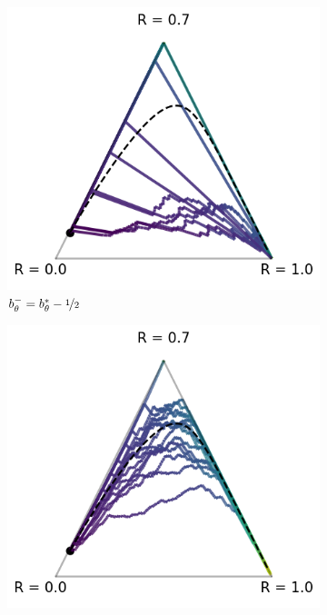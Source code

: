 \begin{figure}[t]
\label{fig:npg_simplex}
\centering
  \begin{subfigure}[b]{0.24\linewidth}
    \includegraphics[width=\textwidth]{articles/baselines/figs/reproduced_simplex_npg/natural_minvar_-05.png}
    \caption{$b^-_\theta = b^*_\theta - \nicefrac{1}{2} $}
    \label{fig:-1}
  \end{subfigure}
  \hfill
    \begin{subfigure}[b]{0.24\linewidth}
    \includegraphics[width=\textwidth]{articles/baselines/figs/reproduced_simplex_npg/natural_minvar_00.png}

\end{subfigure}
\end{figure}
